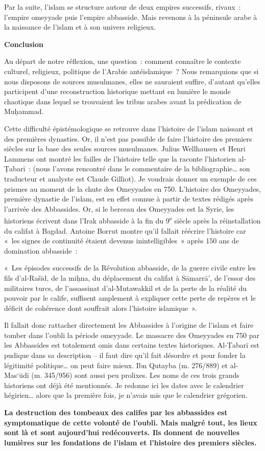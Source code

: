 Par la suite, l'islam se structure autour de deux empires successifs,
rivaux~: l'empire omeyyade puis l'empire abbasside. Mais revenons à la
péninsule arabe à la naissance de l'islam et à son univers religieux.

\textbf{Conclusion}

Au départ de notre réflexion, une question~: comment connaître le
contexte culturel, religieux, politique de l'Arabie antéislamique~? Nous
remarquions que si nous disposons de sources musulmanes, elles ne
sauraient suffire, d'autant qu'elles participent d'une reconstruction
historique mettant en lumière le monde chaotique dans lequel se
trouvaient les tribus arabes avant la prédication de Muḥammad.

Cette difficulté épistémologique se retrouve dans l'histoire de l'islam
naissant et des premières dynasties. Or, il n'est pas possible de faire
l'histoire des premiers siècles sur la base des seules sources
musulmanes. Julius Wellhausen et Henri Lammens ont montré les failles de
l'histoire telle que la raconte l'historien al-Ṭabarī~: (nous l'avons
rencontré dans le commentaire de la bibliographie\ldots{} son traducteur
et analyste est Claude Gilliot). Je voudrais donner un exemple de ces
prismes au moment de la chute des Omeyyades en 750.
L'histoire des Omeyyades, première dynastie de l'islam, est en effet
connue à partir de textes rédigés après l'arrivée des Abbassides. Or, si
le berceau des Omeyyades est la Syrie, les historiens écrivent dans
l'Irak abbasside à la fin du 9\textsuperscript{e} siècle après la
réinstallation du califat à Bagdad. Antoine Borrut montre qu'il fallait
réécrire l'histoire car «~les signes de continuité étaient devenus
inintelligibles~» après 150 ans de domination abbasside~:

«~Les épisodes successifs de la Révolution abbasside, de la guerre
civile entre les fils d'al-Rašīd, de la miḥna, du déplacement du califat
à Sāmarrā', de l'essor des militaires turcs, de l'assassinat
d'al-Mutawakkil et de la perte de la réalité du pouvoir par le calife,
suffisent amplement à expliquer cette perte de repères et le déficit de
cohérence dont souffrait alors l'histoire islamique~».

Il fallait donc rattacher directement les Abbassides à l'origine de
l'islam et faire tomber dans l'oubli la période omeyyade. Le massacre
des Omeyyades en 750 par les Abbassides est totalement omis dans
certains textes historiques. Al-Ṭabarī est pudique dans sa description
-- il faut dire qu'il fait désordre et pour fonder la légitimité
politique\ldots{} on peut faire mieux. Ibn Qutayba (m. 276/889) et
al-Mas`ūdī (m. 345/956) sont aussi peu prolixes. Les noms de ces trois
grands historiens ont déjà été mentionnés. Je redonne ici les dates avec
le calendrier hégirien\ldots{} alors que la première fois, je n'avais
mis que le calendrier grégorien.

\textbf{La destruction des tombeaux des califes par les abbassides est
symptomatique de cette volonté de l'oubli. Mais malgré tout, les lieux
sont là et sont aujourd'hui redécouverts. Ils donnent de nouvelles
lumières sur les fondations de l'islam et l'histoire des premiers
siècles.}